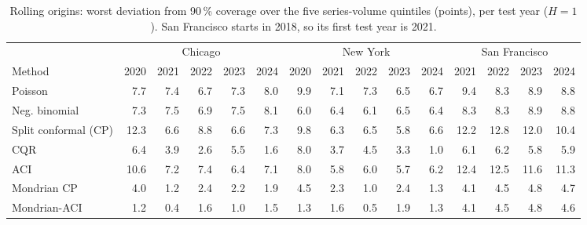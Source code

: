 \begin{table}[!htbp]\centering\scriptsize\setlength{\tabcolsep}{3.5pt}
\caption{Rolling origins: worst deviation from 90\,\% coverage over the five series-volume quintiles (points), per test year ($H=1$). San Francisco starts in 2018, so its first test year is 2021.}\label{tab:rolling}
\begin{adjustbox}{max width=\linewidth}\begin{tabular}{l*{14}{r}}\toprule
 & \multicolumn{5}{c}{Chicago} & \multicolumn{5}{c}{New York} & \multicolumn{4}{c}{San Francisco}\\
Method & 2020 & 2021 & 2022 & 2023 & 2024 & 2020 & 2021 & 2022 & 2023 & 2024 & 2021 & 2022 & 2023 & 2024\\\midrule
Poisson & 7.7 & 7.4 & 6.7 & 7.3 & 8.0 & 9.9 & 7.1 & 7.3 & 6.5 & 6.7 & 9.4 & 8.3 & 8.9 & 8.8 \\
Neg. binomial & 7.3 & 7.5 & 6.9 & 7.5 & 8.1 & 6.0 & 6.4 & 6.1 & 6.5 & 6.4 & 8.3 & 8.3 & 8.9 & 8.8 \\
Split conformal (CP) & 12.3 & 6.6 & 8.8 & 6.6 & 7.3 & 9.8 & 6.3 & 6.5 & 5.8 & 6.6 & 12.2 & 12.8 & 12.0 & 10.4 \\
CQR & 6.4 & 3.9 & 2.6 & 5.5 & 1.6 & 8.0 & 3.7 & 4.5 & 3.3 & 1.0 & 6.1 & 6.2 & 5.8 & 5.9 \\
ACI & 10.6 & 7.2 & 7.4 & 6.4 & 7.1 & 8.0 & 5.8 & 6.0 & 5.7 & 6.2 & 12.4 & 12.5 & 11.6 & 11.3 \\
Mondrian CP & 4.0 & 1.2 & 2.4 & 2.2 & 1.9 & 4.5 & 2.3 & 1.0 & 2.4 & 1.3 & 4.1 & 4.5 & 4.8 & 4.7 \\
Mondrian-ACI & 1.2 & 0.4 & 1.6 & 1.0 & 1.5 & 1.3 & 1.6 & 0.5 & 1.9 & 1.3 & 4.1 & 4.5 & 4.8 & 4.6 \\
\bottomrule\end{tabular}\end{adjustbox}\end{table}
